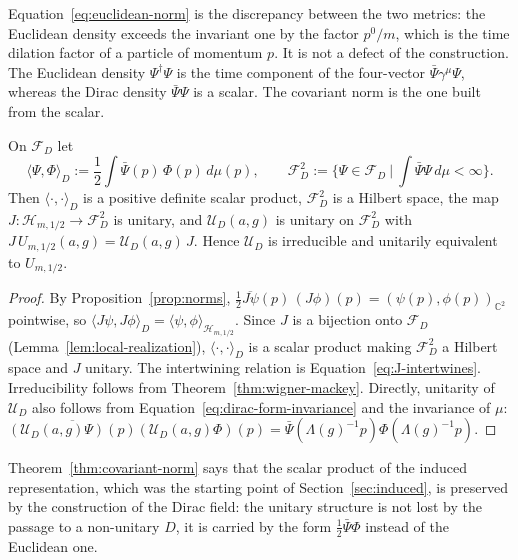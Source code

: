 	Equation~\eqref{eq:euclidean-norm} is the discrepancy between the two metrics: the Euclidean density exceeds the invariant one by the factor $p^0/m$, which is the time dilation factor of a particle of momentum $p$. It is not a defect of the construction. The Euclidean density $\Psi^\dagger\Psi$ is the time component of the four-vector $\bar{\Psi}\gamma^\mu\Psi$, whereas the Dirac density $\bar{\Psi}\Psi$ is a scalar. The covariant norm is the one built from the scalar.
	
	\begin{theorem}\label{thm:covariant-norm}
		On $\mathcal{F}_D$ let
		\begin{equation*}
			\langle\Psi,\Phi\rangle_D:=\frac12\int\bar{\Psi}(p)\,\Phi(p)\,d\mu(p), \qquad \mathcal{F}_D^2:=\Big\{\Psi\in\mathcal{F}_D\ \Big|\ \int\bar{\Psi}\Psi\,d\mu<\infty\Big\}.
		\end{equation*}
		Then $\langle\cdot,\cdot\rangle_D$ is a positive definite scalar product, $\mathcal{F}_D^2$ is a Hilbert space, the map $J:\mathcal{H}_{m,1/2}\to\mathcal{F}_D^2$ is unitary, and $\mathcal{U}_D(a,g)$ is unitary on $\mathcal{F}_D^2$ with $J\,U_{m,1/2}(a,g)=\mathcal{U}_D(a,g)\,J$. Hence $\mathcal{U}_D$ is irreducible and unitarily equivalent to $U_{m,1/2}$.
	\end{theorem}
	
	\begin{proof}
		By Proposition~\ref{prop:norms}, $\tfrac12\overline{J\psi}(p)\,(J\phi)(p)=(\psi(p),\phi(p))_{\mathbb{C}^2}$ pointwise, so $\langle J\psi,J\phi\rangle_D=\langle\psi,\phi\rangle_{\mathcal{H}_{m,1/2}}$. Since $J$ is a bijection onto $\mathcal{F}_D$ (Lemma~\ref{lem:local-realization}), $\langle\cdot,\cdot\rangle_D$ is a scalar product making $\mathcal{F}_D^2$ a Hilbert space and $J$ unitary. The intertwining relation is Equation~\eqref{eq:J-intertwines}. Irreducibility follows from Theorem~\ref{thm:wigner-mackey}. Directly, unitarity of $\mathcal{U}_D$ also follows from Equation~\eqref{eq:dirac-form-invariance} and the invariance of $\mu$: $\overline{(\mathcal{U}_D(a,g)\Psi)(p)}(\mathcal{U}_D(a,g)\Phi)(p)=\bar{\Psi}(\Lambda(g)^{-1}p)\Phi(\Lambda(g)^{-1}p)$.
	\end{proof}
	
	\noindent Theorem~\ref{thm:covariant-norm} says that the scalar product of the induced representation, which was the starting point of Section~\ref{sec:induced}, is preserved by the construction of the Dirac field: the unitary structure is not lost by the passage to a non-unitary $D$, it is carried by the form $\frac12\bar{\Psi}\Phi$ instead of the Euclidean one.
	
